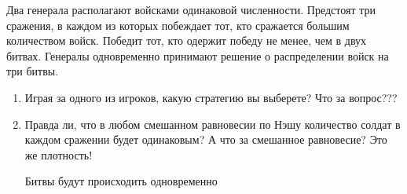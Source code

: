 \begin{problem}
Два генерала располагают войсками одинаковой численности. Предстоят три сражения, в каждом из которых побеждает тот, кто сражается большим количеством войск. Победит тот, кто одержит победу не менее, чем в двух битвах. Генералы одновременно принимают решение о распределении войск на три битвы. 
\begin{enumerate}

\item
Играя за одного из игроков, какую стратегию вы выберете? {\red Что за вопрос???}

\item Правда ли, что в любом смешанном равновесии по Нэшу количество солдат в каждом сражении будет одинаковым?  {\red А что за смешанное равновесие? Это же плотность!}

{\red Битвы будут происходить одновременно}
\end{enumerate}


\begin{sol}

\end{sol}
\end{problem}










